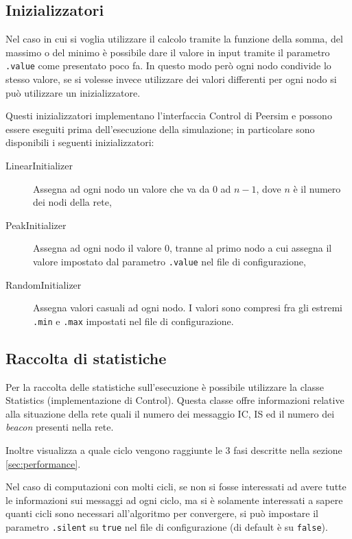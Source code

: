 \documentclass[a4paper,12pt]{article}
\begin{document}
\subsection{Inizializzatori}

Nel caso in cui si voglia utilizzare il calcolo tramite la funzione della somma, del massimo o del minimo \`e possibile dare il valore in input tramite il parametro \texttt{.value} come presentato poco fa. In questo modo per\`o ogni nodo condivide lo stesso valore, se si volesse invece utilizzare dei valori differenti per ogni nodo si pu\`o utilizzare un inizializzatore.

Questi inizializzatori implementano l'interfaccia \textsf{Control} di Peersim e possono essere eseguiti prima dell'esecuzione della simulazione; in particolare sono disponibili i seguenti inizializzatori:
\begin{description}
\item[\textsf{LinearInitializer}] Assegna ad ogni nodo un valore che va da 0 ad $n-1$, dove $n$ \`e il numero dei nodi della rete,
\item[\textsf{PeakInitializer}] Assegna ad ogni nodo il valore 0, tranne al primo nodo a cui assegna il valore impostato dal parametro \texttt{.value} nel file di configurazione,
\item[\textsf{RandomInitializer}] Assegna valori casuali ad ogni nodo. I valori sono compresi fra gli estremi \texttt{.min} e \texttt{.max} impostati nel file di configurazione.
\end{description}
\subsection{Raccolta di statistiche}

Per la raccolta delle statistiche sull'esecuzione \`e possibile utilizzare la classe \textsf{Statistics} (implementazione di \textsf{Control}). Questa classe offre informazioni relative alla situazione della rete quali il numero dei messaggio IC, IS ed il numero dei \emph{beacon} presenti nella rete.

Inoltre visualizza a quale ciclo vengono raggiunte le 3 fasi descritte nella sezione \ref{sec:performance}. 

Nel caso di computazioni con molti cicli, se non si fosse interessati ad avere tutte le informazioni sui messaggi ad ogni ciclo, ma si \`e solamente interessati a sapere quanti cicli sono necessari all'algoritmo per convergere, si pu\`o impostare il parametro \texttt{.silent} su \texttt{true} nel file di configurazione (di default \`e su \texttt{false}).
\end{document}
